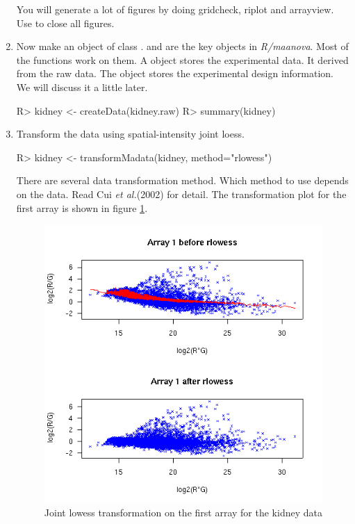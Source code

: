 \begin{enumerate}
You will generate a lot of figures by doing 
gridcheck, riplot and arrayview. Use
 to close all figures.

\item Now make an object of class .
 and 
are the key objects in {\em R/maanova}. Most of the functions work on
them. A  object stores the experimental data. It derived
from the raw data. The  object stores the experimental 
design information. We will discuss it a little later.
\begin{Sinput}
R> kidney <- createData(kidney.raw)
R> summary(kidney)
\end{Sinput}

\item Transform the data using spatial-intensity joint loess.
\begin{Sinput}
R> kidney <- transformMadata(kidney, method="rlowess")
\end{Sinput}

There are several data transformation method. Which method to use depends on
the data. Read Cui {\it et al.}(2002) for detail. The transformation
plot for the first array is shown in figure \ref{fig:lowess}.

\begin{figure}[htbp]
\centering
\includegraphics{rlowess.png}
\caption{Joint lowess transformation on the first array for the kidney data}
\label{fig:lowess}
\end{figure}


\end{enumerate}
